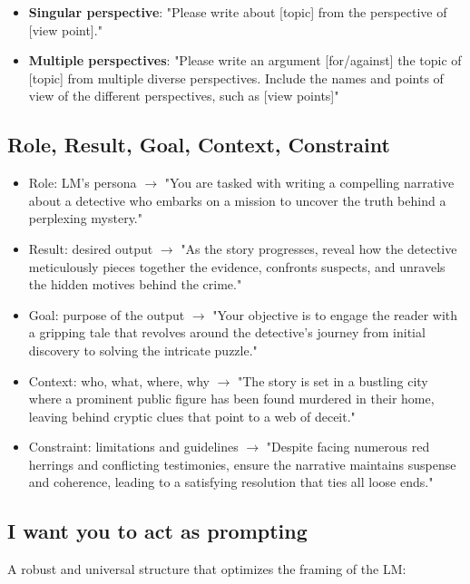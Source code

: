 \begin{itemize}
  \item  \textbf{Singular perspective}: "Please write about [topic] from the
        perspective of [view point]."
  \item  \textbf{Multiple perspectives}: "Please write an argument [for/against]
        the topic of [topic] from multiple diverse perspectives. Include the names and
        points of view of the different perspectives, such as [view points]"
\end{itemize}


\subsection{Role, Result, Goal, Context, Constraint}


\begin{itemize}
  \item Role: LM's persona $\to$ "You are tasked with writing a compelling
        narrative about a detective who embarks on a mission to uncover the truth
        behind a perplexing mystery."

  \item Result: desired output $\to$ "As the story progresses, reveal how the
        detective meticulously pieces together the evidence, confronts suspects, and
        unravels the hidden motives behind the crime."

  \item Goal: purpose of the output $\to$ "Your objective is to engage the
        reader with a gripping tale that revolves around the detective's journey from
        initial discovery to solving the intricate puzzle."

  \item Context: who, what, where, why $\to$ "The story is set in a bustling
        city where a prominent public figure has been found murdered in their home,
        leaving behind cryptic clues that point to a web of deceit."

  \item Constraint: limitations and guidelines $\to$ "Despite facing numerous
        red herrings and conflicting testimonies, ensure the narrative maintains
        suspense and coherence, leading to a satisfying resolution that ties all loose
        ends."
\end{itemize}

\subsection{I want you to act as prompting}
A robust and universal structure that optimizes the framing of the LM:

